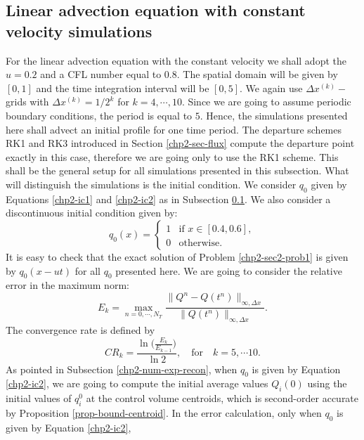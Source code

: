 \subsection{Linear advection equation with constant velocity simulations}
\label{chp2-sec-numerical-exp-1}
For the linear advection equation with the constant velocity we shall adopt the $u=0.2$ and 
a CFL number equal to $0.8$.
The spatial domain will be given by $[0,1]$ and the time integration interval will be $[0,5]$. We again use $\Delta x^{(k)}-$grids with $\Delta x^{(k)} = 1/2^k$ for $k=4,
 \cdots, 10$.
Since we are going to assume periodic boundary conditions, the period is equal to $5$. 
Hence, the simulations presented here shall advect an initial profile for one time period. 
The departure schemes RK1 and RK3 introduced in Section \ref{chp2-sec-flux} compute
the departure point exactly in this case, therefore we are going only to use the RK1 scheme.
This shall be the general setup for all simulations presented in this subsection. 
What will distinguish the simulations is the initial condition.
We consider $q_0$ given by Equations \eqref{chp2-ic1} and \eqref{chp2-ic2} as
in Subsection \ref{chp2-sec-numerical-exp-1}.
We also consider a discontinuous initial condition given by:
\begin{equation}
	\label{chp2-ic3}
		q_0(x) =  
  \begin{cases}
		1 & \text{if } x \in [0.4,0.6],\\
		0 & \text{otherwise}.
  \end{cases}
\end{equation}
It is easy to check that the  exact solution of Problem \ref{chp2-sec2-prob1}
is given by $q_0(x-ut)$ for all $q_0$ presented here. We are going to consider the relative
error in the maximum norm:
\begin{equation*}
	E_k = \max_{n=0,\cdots, N_T}
	\frac{\| Q^n - Q(t^n) \|_{\infty, \Delta x}}{\|Q(t^n)\|_{\infty, \Delta x}}.
\end{equation*}
The convergence rate is defined by
\begin{equation*}
	CR_k = \frac{\ln{\bigg(\frac{E_{k}}{E_{k-1}}}\bigg)}{\ln 2}, \quad \text{for} \quad k = 5, \cdots 10.
\end{equation*}
As pointed in Subsection \ref{chp2-num-exp-recon}, when $q_0$ is given by Equation \eqref{chp2-ic2},
we are going to compute the initial average values $Q_i(0)$ using
the initial values of $q^0_i$ at the control volume centroids, which is second-order 
accurate by Proposition \ref{prop-bound-centroid}. 
In the error calculation, only when $q_0$ is given by Equation \eqref{chp2-ic2},
